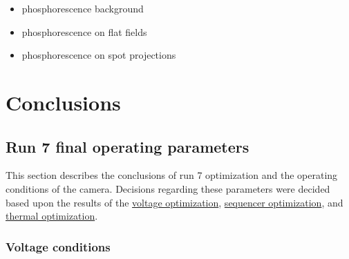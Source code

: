 \begin{itemize}
\tightlist
\item
  phosphorescence background
\item
  phosphorescence on flat fields
\item
  phosphorescence on spot projections
\end{itemize}

\section{Conclusions}\label{conclusions}

\subsection{Run 7 final operating
parameters}\label{run-7-final-operating-parameters}

This section describes the conclusions of run 7 optimization and the
operating conditions of the camera. Decisions regarding these parameters
were decided based upon the results of the
\href{https://sitcomtn-148.lsst.io/\#persistence-optimization}{voltage
optimization},
\href{https://sitcomtn-148.lsst.io/\#sequencer-optimization}{sequencer
optimization}, and
\href{https://sitcomtn-148.lsst.io/\#thermal-optimization}{thermal
optimization}.

\subsubsection{Voltage conditions}\label{voltage-conditions}

